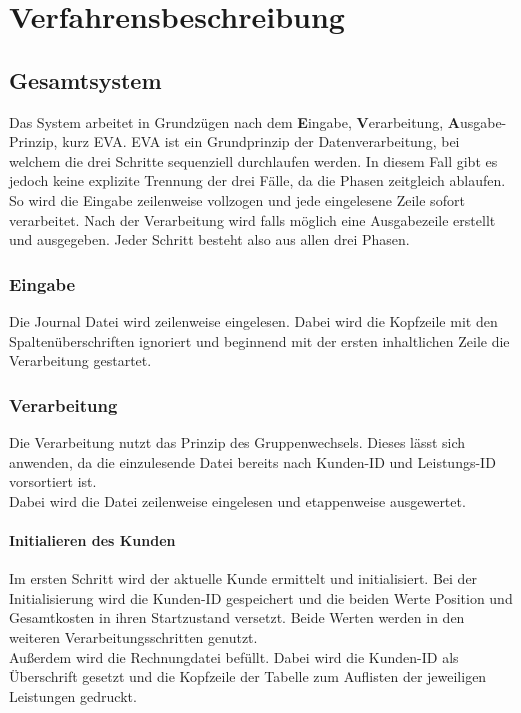 \chapter{Verfahrensbeschreibung}\label{ch:verfahrensbeschreibung}


\section{Gesamtsystem}\label{sec:gesamtsystem}
Das System arbeitet in Grundzügen nach dem \textbf{E}ingabe, \textbf{V}erarbeitung, \textbf{A}usgabe-Prinzip, kurz EVA.
EVA ist ein Grundprinzip der Datenverarbeitung, bei welchem die drei Schritte sequenziell durchlaufen werden.
In diesem Fall gibt es jedoch keine explizite Trennung der drei Fälle, da die Phasen zeitgleich ablaufen. So wird die Eingabe zeilenweise vollzogen und jede eingelesene Zeile sofort verarbeitet. Nach der Verarbeitung wird falls möglich eine Ausgabezeile erstellt und ausgegeben. Jeder Schritt besteht also aus allen drei Phasen.\\

\subsection{Eingabe}\label{subsec:eingabe}
Die Journal Datei wird zeilenweise eingelesen. Dabei wird die Kopfzeile mit den Spaltenüberschriften ignoriert und beginnend mit der ersten inhaltlichen Zeile die Verarbeitung gestartet.\\

\subsection{Verarbeitung}\label{subsec:verarbeitung}
Die Verarbeitung nutzt das Prinzip des Gruppenwechsels. Dieses lässt sich anwenden, da die einzulesende Datei bereits nach Kunden-ID und Leistungs-ID vorsortiert ist.\\
Dabei wird die Datei zeilenweise eingelesen und etappenweise ausgewertet.

\subsubsection{Initialieren des Kunden}\label{subsubsec:initialisieren-des-kunden}
Im ersten Schritt wird der aktuelle Kunde ermittelt und initialisiert. Bei der Initialisierung wird die Kunden-ID gespeichert und die beiden Werte Position und Gesamtkosten in ihren Startzustand versetzt. Beide Werten werden in den weiteren Verarbeitungsschritten genutzt.\\
Außerdem wird die Rechnungdatei befüllt. Dabei wird die Kunden-ID als Überschrift gesetzt und die Kopfzeile der Tabelle zum Auflisten der jeweiligen Leistungen gedruckt.\\

